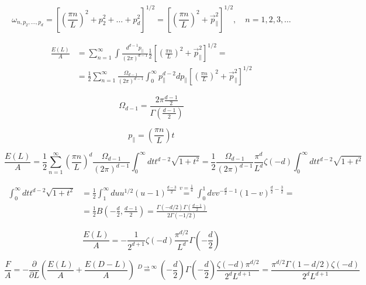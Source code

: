 \begin{solution}
	$$
	\omega_{n, p_{2}, \ldots, p_{d}}=\left[\left(\frac{\pi n}{L}\right)^{2}+p_{2}^{2}+\ldots+p_{d}^{2}\right]^{1 / 2}=\left[\left(\frac{\pi n}{L}\right)^{2}+\vec{p}_{ \|}^{2}\right]^{1 / 2}, \quad n=1,2,3, \ldots
	$$
	
	$$
	\begin{aligned} \frac{E(L)}{A} &=\sum_{n=1}^{\infty} \int \frac{d^{d-1} p_{ \|}}{(2 \pi)^{d-1}} \frac{1}{2}\left[\left(\frac{\pi n}{L}\right)^{2}+\vec{p}_{ \|}^{2}\right]^{1 / 2}=\\ &=\frac{1}{2} \sum_{n=1}^{\infty} \frac{\Omega_{d-1}}{(2 \pi)^{d-1}} \int_{0}^{\infty} p_{ \|}^{d-2} d p_{ \|}\left[\left(\frac{\pi n}{L}\right)^{2}+\vec{p}_{ \|}^{2}\right]^{1 / 2} \end{aligned}
	$$
	
	$$
	\Omega_{d-1}=\frac{2 \pi \frac{d-1}{2}}{\Gamma\left(\frac{d-1}{2}\right)}
	$$
	
	$$
	p_{ \|}=\left(\frac{\pi n}{L}\right) t
	$$
	
	$$
	\frac{E(L)}{A}=\frac{1}{2} \sum_{n=1}^{\infty}\left(\frac{\pi n}{L}\right)^{d} \frac{\Omega_{d-1}}{(2 \pi)^{d-1}} \int_{0}^{\infty} d t t^{d-2} \sqrt{1+t^{2}}=\frac{1}{2} \frac{\Omega_{d-1}}{(2 \pi)^{d-1}} \frac{\pi^{d}}{L^{d}} \zeta(-d) \int_{0}^{\infty} d t t^{d-2} \sqrt{1+t^{2}}
	$$
	
	$$
	\begin{aligned} \int_{0}^{\infty} d t t^{d-2} \sqrt{1+t^{2}} &=\frac{1}{2} \int_{1}^{\infty} d u u^{1 / 2}(u-1)^{\frac{d-3}{2}} \stackrel{v=\frac{1}{u}}{=} \int_{0}^{1} d v v^{-\frac{d}{2}-1}(1-v)^{\frac{d}{2}-\frac{3}{2}}=\\ &=\frac{1}{2} B\left(-\frac{d}{2}, \frac{d-1}{2}\right)=\frac{\Gamma(-d / 2) \Gamma\left(\frac{d-1}{2}\right)}{2 \Gamma(-1 / 2)} \end{aligned}
	$$
	
	$$
	\frac{E(L)}{A}=-\frac{1}{2^{d+1}} \zeta(-d) \frac{\pi^{d / 2}}{L^{d}} \Gamma\left(-\frac{d}{2}\right)
	$$
	
	$$
	\frac{F}{A}=-\frac{\partial}{\partial L}\left(\frac{E(L)}{A}+\frac{E(D-L)}{A}\right) \stackrel{D \rightarrow \infty}{=}\left(-\frac{d}{2}\right) \Gamma\left(-\frac{d}{2}\right) \frac{\zeta(-d) \pi^{d / 2}}{2^{d} L^{d+1}}=\frac{\pi^{d / 2} \Gamma(1-d / 2) \zeta(-d)}{2^{d} L^{d+1}}
	$$
\end{solution}	